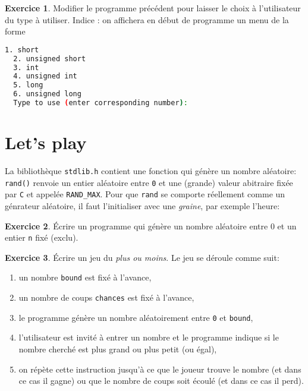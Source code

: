 \documentclass[french,a4paper]{article}
\theoremstyle{definition}
\newtheorem{exercise}{Exercice}
\theoremstyle{remark}
\newcommand{\inlinec}[1]{\lstinline[style=C]°#1°}
\begin{document}
\begin{exercise}
  Modifier le programme précédent pour laisser le choix à
  l'utilisateur du type à utiliser. Indice : on affichera en début de
  programme un menu de la forme
  \begin{lstlisting}[language=sh,identifierstyle=\color{black}]
  1. short
  2. unsigned short
  3. int
  4. unsigned int
  5. long
  6. unsigned long
  Type to use (enter corresponding number):
  \end{lstlisting}
\end{exercise}

\section{Let's play}
\label{sec:games}

La bibliothèque \inlinec{stdlib.h} contient une fonction qui génère un
nombre aléatoire: \inlinec{rand()} renvoie un entier aléatoire entre
\inlinec{0} et une (grande) valeur abitraire fixée par {\tt C} et
appelée \inlinec{RAND_MAX}. Pour que \inlinec{rand} se comporte
réellement comme un génrateur aléatoire, il faut l'initialiser avec
une {\em graine}, par exemple l'heure: 

\begin{exercise}
  \'Ecrire un programme qui génère un nombre aléatoire entre 0 et un
  entier \inlinec{n} fixé (exclu).
\end{exercise}

\begin{exercise}
  \'Ecrire un jeu du {\em plus ou moins}. Le jeu se déroule comme suit:
  \begin{enumerate}[label=(\arabic*)]
  \item un nombre \inlinec{bound} est fixé à l'avance,
  \item un nombre de coups \inlinec{chances} est fixé à l'avance,
  \item le programme génère un nombre aléatoirement entre \inlinec{0}
    et \inlinec{bound},
  \item l'utilisateur est invité à entrer un nombre et le programme
    indique si le nombre cherché est plus grand ou plus petit (ou
    égal),
  \item on répète cette instruction jusqu'à ce que le joueur trouve le
    nombre (et dans ce cas il gagne) ou que le nombre de coups soit
    écoulé (et dans ce cas il perd).
  \end{enumerate}
\end{exercise}
\end{document}
